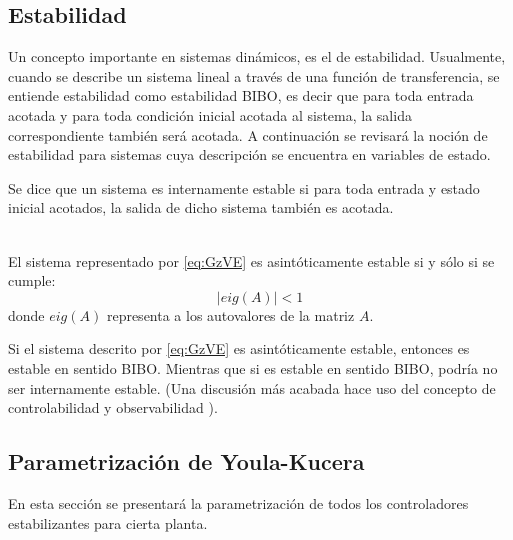 \subsection{Estabilidad}
Un concepto importante en sistemas din\'amicos, es el de estabilidad. Usualmente, cuando se describe un sistema lineal a trav\'es de una funci\'on de transferencia, se entiende estabilidad como estabilidad BIBO, es decir que para toda entrada acotada y para toda condici\'on inicial acotada al sistema, la salida correspondiente tambi\'en ser\'a acotada. A continuaci\'on se revisar\'a la noci\'on de estabilidad para sistemas cuya descripci\'on se encuentra en variables de estado.

\begin{defin}
Se dice que un sistema es internamente estable si para toda entrada y estado inicial acotados, la salida de dicho sistema tambi\'en es acotada.
\end{defin}

\begin{lema}{\ \\}
El sistema representado por \eqref{eq:GzVE} es asint\'oticamente estable si y s\'olo si se cumple:
\begin{equation}
\vert eig(A)\vert <1
\end{equation}
donde $eig(A)$ representa a los autovalores de la matriz $A$.\QED
\end{lema}

\begin{obs}
Si el sistema descrito por \eqref{eq:GzVE} es asint\'oticamente estable, entonces es estable en sentido BIBO. Mientras que si es estable en sentido BIBO, podr\'ia no ser internamente estable. (Una discusi\'on m\'as acabada hace uso del concepto de controlabilidad y observabilidad \cite{astwit97,zhdogl96}).
\end{obs}

\subsection{Parametrizaci\'on de Youla-Kucera}\label{sec:youla}
En esta secci\'on se presentar\'a la parametrizaci\'on de todos los controladores estabilizantes para cierta planta. 

